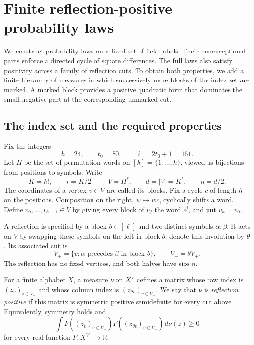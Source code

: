 \section{Finite reflection-positive probability laws}
\label{sec:tuple-laws}

We construct probability laws on a fixed set of field labels.  Their
nonexceptional parts enforce a directed cycle of square differences.
The full laws also satisfy positivity across a family of reflection cuts.
To obtain both properties, we add a finite hierarchy of measures in which
successively more blocks of the index set are marked.  A marked block
provides a positive quadratic form that dominates the small negative part
at the corresponding unmarked cut.

\subsection{The index set and the required properties}

Fix the integers
\begin{equation}
 h=24,\qquad t_0=80,\qquad \ell=2t_0+1=161.
 \label{eq:tuple-fixed-parameters}
\end{equation}
Let \(\Pi\) be the set of permutation words on \([h]=\{1,\ldots,h\}\),
viewed as bijections from positions to symbols.  Write
\[
 K=h!,\qquad r=K/2,\qquad V=\Pi^\ell,\qquad d=|V|=K^\ell,
 \qquad n=d/2.
\]
The coordinates of a vertex \(v\in V\) are called its blocks.
Fix a cycle \(c\) of length \(h\) on the positions.  Composition on
the right, \(w\mapsto wc\), cyclically shifts a word.  Define
\(v_0,\ldots,v_{h-1}\in V\) by giving every block of \(v_j\) the
word \(c^j\), and put \(v_h=v_0\).

A reflection is specified by a block \(b\in[\ell]\) and two
distinct symbols \(\alpha,\beta\).  It acts on \(V\) by swapping
these symbols on the left in block \(b\); denote this involution by
\(\theta\).  Its associated cut is
\[
 V_+=\{v:\alpha\text{ precedes }\beta\text{ in block }b\},
 \qquad V_-=\theta V_+.
\]
The reflection has no fixed vertices, and both halves have size \(n\).

For a finite alphabet \(X\), a measure \(\nu\) on \(X^V\) defines
a matrix whose row index is \((z_v)_{v\in V_+}\) and whose column
index is \((z_{\theta v})_{v\in V_+}\).  We say that \(\nu\) is
\emph{reflection positive} if this matrix is symmetric positive
semidefinite for every cut above.  Equivalently, symmetry holds and
\[
 \int F((z_v)_{v\in V_+})F((z_{\theta v})_{v\in V_+})\,d\nu(z)
 \ge0
\]
for every real function \(F:X^{V_+}\to\mathbb R\).

